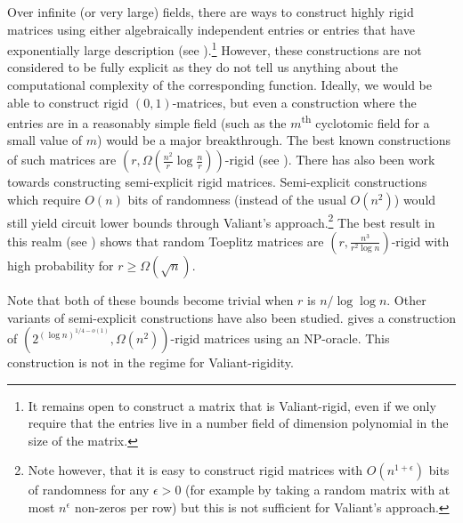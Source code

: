 \documentclass{toc}
\newcommand{\ts}{\textsuperscript}
\begin{document}
Over infinite (or very large) fields, there are ways to construct  highly rigid matrices using either algebraically independent  entries or entries that have exponentially large description (see \cite{construction1, construction2, Vandermonde}).\footnote{It remains open to construct a matrix
 that is Valiant-rigid, even if we only require that the entries live
 in a number field of dimension polynomial in the size of the matrix.}  
However, these constructions are not considered to be fully explicit as they do not tell us anything about the computational complexity of the corresponding function.  Ideally, we would be able to construct rigid $(0,1)$-matrices, 
but even a construction where the entries are in a reasonably simple field
%
%
(such as the $m$\ts{th} cyclotomic field for a small value of $m$)  %
would be a major breakthrough.  The best known constructions of such
matrices are 
%
$(r,\Omega(\frac{n^2}{r} \log \frac{n}{r}))$-rigid
%
(see \cite{rigidity_construction, friedman_rigidity}).  There has also been work towards constructing semi-explicit rigid matrices.  Semi-explicit constructions which require $O(n)$ bits of randomness (instead of the usual $O(n^2)$) would still yield circuit lower bounds through Valiant's approach.\footnote{Note however, that it is easy to construct rigid matrices with $O(n^{1 + \epsilon})$ bits of randomness for any $\epsilon > 0$ (for example by taking a random matrix with at most $n^{\epsilon}$ non-zeros per row) but this is not sufficient for Valiant's approach.}  The best result in this realm (see \cite{toeplitz}) shows that random Toeplitz matrices are $(r, \frac{n^3}{r^2 \log n})$-rigid with high probability for $r \geq \Omega(\sqrt n)$.

Note that both of these bounds become trivial when $r$ is
%
$n/\log\log n$.       %
Other variants of semi-explicit constructions have also been studied.
\cite{npconstruction} gives a construction of 
%
$(2^{(\log n)^{1/4 - o(1)}}, \Omega(n^2) )$-rigid 
%
matrices using an NP-oracle.  This construction is not in the regime
for Valiant-rigidity.
\end{document}
